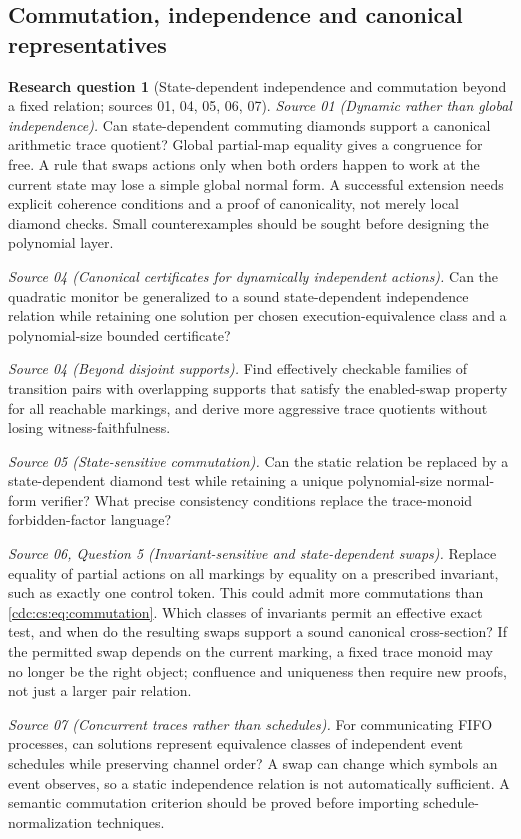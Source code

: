 \documentclass[11pt,a4paper]{article}
\theoremstyle{definition}
\newtheorem{question}[question]{Research question}
\theoremstyle{remark}
\begin{document}
\subsection{Commutation, independence and canonical representatives}

\begin{question}[State-dependent independence and commutation beyond a fixed relation; sources 01, 04, 05, 06, 07]\label{cdc:q:dynamic}
\emph{Source 01 (Dynamic rather than global independence).}
Can state-dependent commuting diamonds support a canonical arithmetic trace quotient? Global partial-map equality gives a congruence for free. A rule that swaps actions only when both orders happen to work at the current state may lose a simple global normal form. A successful extension needs explicit coherence conditions and a proof of canonicality, not merely local diamond checks. Small counterexamples should be sought before designing the polynomial layer.

\emph{Source 04 (Canonical certificates for dynamically independent actions).}
Can the quadratic monitor be generalized to a sound state-dependent independence relation while retaining one solution per chosen execution-equivalence class and a polynomial-size bounded certificate?

\emph{Source 04 (Beyond disjoint supports).}
Find effectively checkable families of transition pairs with overlapping supports that satisfy the enabled-swap property for all reachable markings, and derive more aggressive trace quotients without losing witness-faithfulness.

\emph{Source 05 (State-sensitive commutation).}
Can the static relation be replaced by a state-dependent diamond test while retaining a unique polynomial-size normal-form verifier? What precise consistency conditions replace the trace-monoid forbidden-factor language?

\emph{Source 06, Question 5 (Invariant-sensitive and state-dependent swaps).}
Replace equality of partial actions on all markings by
equality on a prescribed invariant, such as exactly one control token. This
could admit more commutations than \eqref{cdc:cs:eq:commutation}. Which classes of
invariants permit an effective exact test, and when do the resulting swaps
support a sound canonical cross-section? If the permitted swap depends on
the current marking, a fixed trace monoid may no longer be the right object;
confluence and uniqueness then require new proofs, not just a larger pair
relation.

\emph{Source 07 (Concurrent traces rather than schedules).}
For communicating FIFO processes, can solutions represent equivalence classes of independent event schedules while preserving channel order? A swap can change which symbols an event observes, so a static independence relation is not automatically sufficient. A semantic commutation criterion should be proved before importing schedule-normalization techniques.
\end{question}
\end{document}
